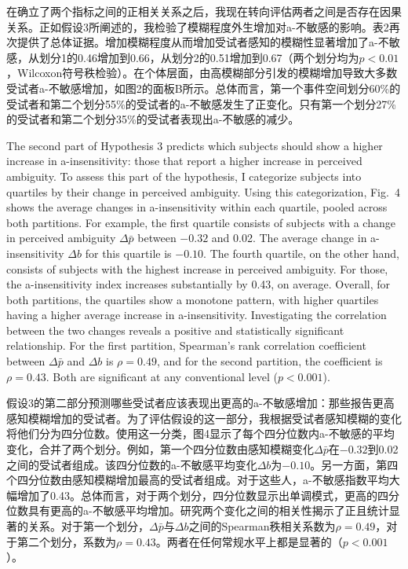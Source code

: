 \documentclass[12pt,a4paper]{article}
\newenvironment{original}
  {\par\medskip\noindent\color{black}\ignorespaces}
  {\par\medskip}
\newenvironment{translation}
  {\par\noindent\color{transblue}\ignorespaces}
  {\par\medskip\medskip}
\begin{document}
\begin{translation}
在确立了两个指标之间的正相关关系之后，我现在转向评估两者之间是否存在因果关系。正如假设3所阐述的，我检验了模糊程度外生增加对a-不敏感的影响。表2再次提供了总体证据。增加模糊程度从而增加受试者感知的模糊性显著增加了a-不敏感，从划分1的0.46增加到0.66，从划分2的0.51增加到0.67（两个划分均为$p < 0.01$，Wilcoxon符号秩检验）。在个体层面，由高模糊部分引发的模糊增加导致大多数受试者a-不敏感增加，如图2的面板B所示。总体而言，第一个事件空间划分60\%的受试者和第二个划分55\%的受试者的a-不敏感发生了正变化。只有第一个划分27\%的受试者和第二个划分35\%的受试者表现出a-不敏感的减少。
\end{translation}

\begin{original}
The second part of Hypothesis 3 predicts which subjects should show a higher increase in a-insensitivity: those that report a higher increase in perceived ambiguity. To assess this part of the hypothesis, I categorize subjects into quartiles by their change in perceived ambiguity. Using this categorization, Fig.\ 4 shows the average changes in a-insensitivity within each quartile, pooled across both partitions. For example, the first quartile consists of subjects with a change in perceived ambiguity $\Delta \bar{p}$ between $-0.32$ and 0.02. The average change in a-insensitivity $\Delta b$ for this quartile is $-0.10$. The fourth quartile, on the other hand, consists of subjects with the highest increase in perceived ambiguity. For those, the a-insensitivity index increases substantially by 0.43, on average. Overall, for both partitions, the quartiles show a monotone pattern, with higher quartiles having a higher average increase in a-insensitivity. Investigating the correlation between the two changes reveals a positive and statistically significant relationship. For the first partition, Spearman's rank correlation coefficient between $\Delta \bar{p}$ and $\Delta b$ is $\rho = 0.49$, and for the second partition, the coefficient is $\rho = 0.43$. Both are significant at any conventional level ($p < 0.001$).
\end{original}

\begin{translation}
假设3的第二部分预测哪些受试者应该表现出更高的a-不敏感增加：那些报告更高感知模糊增加的受试者。为了评估假设的这一部分，我根据受试者感知模糊的变化将他们分为四分位数。使用这一分类，图4显示了每个四分位数内a-不敏感的平均变化，合并了两个划分。例如，第一个四分位数由感知模糊变化$\Delta \bar{p}$在$-0.32$到0.02之间的受试者组成。该四分位数的a-不敏感平均变化$\Delta b$为$-0.10$。另一方面，第四个四分位数由感知模糊增加最高的受试者组成。对于这些人，a-不敏感指数平均大幅增加了0.43。总体而言，对于两个划分，四分位数显示出单调模式，更高的四分位数具有更高的a-不敏感平均增加。研究两个变化之间的相关性揭示了正且统计显著的关系。对于第一个划分，$\Delta \bar{p}$与$\Delta b$之间的Spearman秩相关系数为$\rho = 0.49$，对于第二个划分，系数为$\rho = 0.43$。两者在任何常规水平上都是显著的（$p < 0.001$）。
\end{translation}
\end{document}
